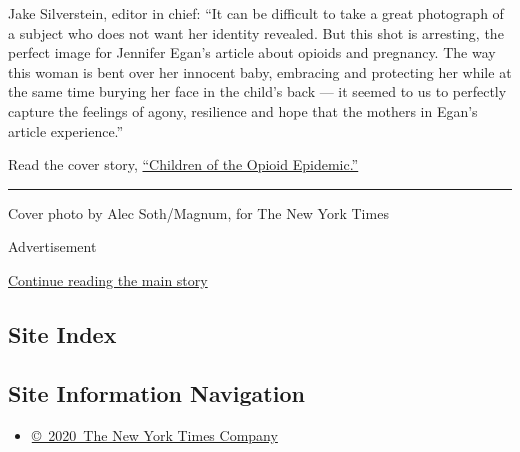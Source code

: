 Jake Silverstein, editor in chief: ``It can be difficult to take a great
photograph of a subject who does not want her identity revealed. But
this shot is arresting, the perfect image for Jennifer Egan's article
about opioids and pregnancy. The way this woman is bent over her
innocent baby, embracing and protecting her while at the same time
burying her face in the child's back --- it seemed to us to perfectly
capture the feelings of agony, resilience and hope that the mothers in
Egan's article experience.''

Read the cover story,
\href{https://www.nytimes3xbfgragh.onion/2018/05/09/magazine/children-of-the-opioid-epidemic.html}{``Children
of the Opioid Epidemic.''}

\begin{center}\rule{0.5\linewidth}{\linethickness}\end{center}

Cover photo by Alec Soth/Magnum, for The New York Times

Advertisement

\protect\hyperlink{after-bottom}{Continue reading the main story}

\hypertarget{site-index}{%
\subsection{Site Index}\label{site-index}}

\hypertarget{site-information-navigation}{%
\subsection{Site Information
Navigation}\label{site-information-navigation}}

\begin{itemize}
\tightlist
\item
  \href{https://help.nytimes3xbfgragh.onion/hc/en-us/articles/115014792127-Copyright-notice}{©~2020~The
  New York Times Company}
\end{itemize}

